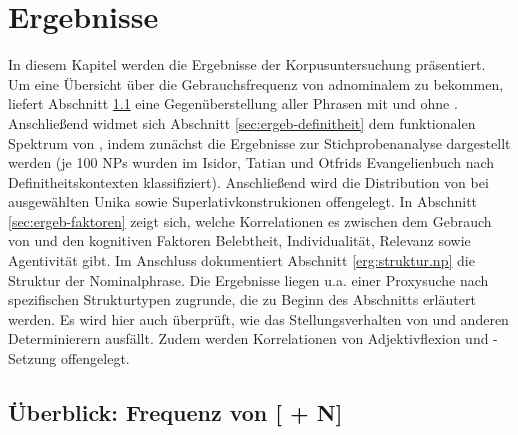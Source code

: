 \chapter{Ergebnisse}\label{ergebnisse}

In diesem Kapitel werden die Ergebnisse der Korpusuntersuchung präsentiert. Um eine Übersicht über die Gebrauchsfrequenz von adnominalem  zu bekommen, liefert Abschnitt \ref{sec:ergeb-ther-freq} eine Gegenüberstellung aller Phrasen mit und ohne . Anschließend widmet sich Abschnitt \ref{sec:ergeb-definitheit} dem funktionalen Spektrum von , indem zunächst die Ergebnisse zur Stichprobenanalyse dargestellt werden (je 100 NPs wurden im Isidor, Tatian und Otfrids Evangelienbuch nach Definitheitskontexten klassifiziert). Anschließend wird die Distribution von  bei ausgewählten Unika sowie Superlativkonstrukionen offengelegt. In Abschnitt \ref{sec:ergeb-faktoren} zeigt sich, welche Korrelationen es zwischen dem Gebrauch von  und den kognitiven Faktoren Belebtheit, Individualität, Relevanz sowie Agentivität gibt. 
Im Anschluss dokumentiert Abschnitt \ref{erg:struktur.np} die Struktur der Nominalphrase. Die Ergebnisse liegen u.a. einer Proxysuche nach spezifischen Strukturtypen zugrunde, die zu Beginn des Abschnitts erläutert werden. Es wird hier auch überprüft, wie das Stellungsverhalten von  und anderen Determinierern ausfällt. Zudem werden Korrelationen von Adjektivflexion  und -Setzung offengelegt. 

\section{Überblick: Frequenz von [ + N]}\label{sec:ergeb-ther-freq}

